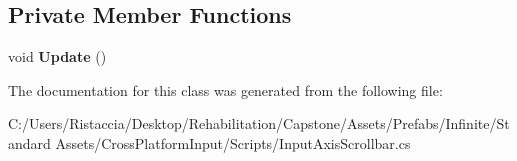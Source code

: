 \subsection*{Private Member Functions}
\begin{DoxyCompactItemize}
\item 
\mbox{\label{class_unity_standard_assets_1_1_cross_platform_input_1_1_input_axis_scrollbar_af70d9917168b9037f3aaf720d880c1f6}} 
void {\bfseries Update} ()
\end{DoxyCompactItemize}


The documentation for this class was generated from the following file\+:\begin{DoxyCompactItemize}
\item 
C\+:/\+Users/\+Ristaccia/\+Desktop/\+Rehabilitation/\+Capstone/\+Assets/\+Prefabs/\+Infinite/\+Standard Assets/\+Cross\+Platform\+Input/\+Scripts/Input\+Axis\+Scrollbar.\+cs\end{DoxyCompactItemize}
